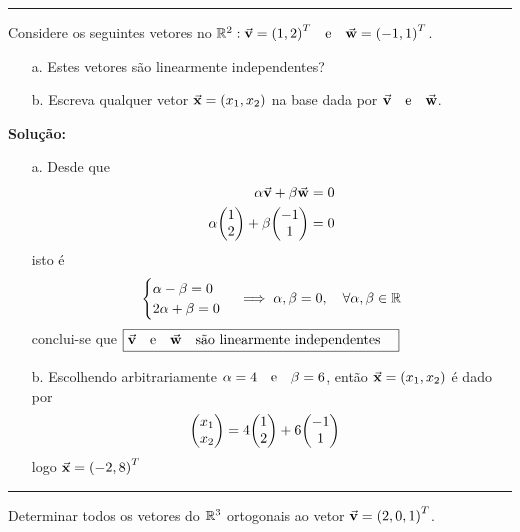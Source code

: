 \documentclass[
  a4paper,
	12pt
]{article}
\begin{document}
\begin{center}
	\noindent\textcolor{mygray}{\rule{\textwidth}{0.5pt}}
\end{center}
\begin{problem}
	Considere os seguintes vetores no $\mathbb{R}^{2}: \va{v}=\qty(1,2)^{T}\qq{e}\va{w}=\qty(-1,1)^{T}$.
	\begin{itemize}
		\item[a.] Estes vetores são linearmente independentes?
		\item[b.] Escreva qualquer vetor $\va{x}=\qty(x_{1},x_{2})$ na base dada por $\va{v}\qq{e}\va{w}$.
	\end{itemize}
\end{problem}
\textcolor{deepGreen}{\textbf{Solução:}}
\begin{itemize}
	\item[a.] Desde que
		\begin{align*}
			\alpha \va{v}+\beta \va{w} &= 0\\
			\alpha\mqty(1\\2)+\beta\mqty(-1\\1) &= 0
		\end{align*}
		isto é
		\begin{equation*}
			\begin{cases}
				\alpha-\beta = 0\\
				2 \alpha+\beta =0
			\end{cases}	\implies \alpha,\beta=0\qc\forall \alpha,\beta \in \mathbb{R} 
		\end{equation*}
		conclui-se que $\boxed{\va{v}\qq{e}\va{w}\qq{são linearmente independentes}}$
	\item[b.] Escolhendo arbitrariamente $\alpha=4\qq{e} \beta=6$, então $\va{x}=\qty(x_{1},x_{2})$ é dado por
		\begin{align*}
			\mqty(x_{1}\\ x_{2}) &= 4\mqty(1\\2)+6\mqty(-1\\1)
		\end{align*}
		logo $\va{x}=\qty(-2,8)^{T}$
\end{itemize}
\begin{center}
	\noindent\textcolor{mygray}{\rule{\textwidth}{0.5pt}}
\end{center}
\begin{problem}
	Determinar todos os vetores do $\mathbb{R}^{3}$ ortogonais ao vetor $\va{v}=\qty(2,0,1)^{T}$.
\end{problem}
\end{document}
